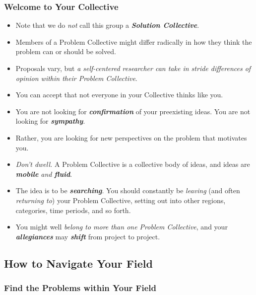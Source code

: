 \documentclass[11pt]{article}
\begin{document}
\subsubsection{Welcome to Your Collective}
\begin{itemize}
\item Note that we do \emph{not} call this group a \emph{\textbf{Solution Collective}}.

\item Members of a Problem Collective might differ radically in how they think the problem can or should be solved.

\item Proposals vary, but \emph{a self-centered researcher can take in stride differences of opinion within their Problem Collective}. 

\item You can accept that not everyone in your Collective thinks like you.

\item You are not looking for \emph{\textbf{confirmation}} of your preexisting ideas. You are not looking for \emph{\textbf{sympathy}}.

\item Rather, you are looking for new perspectives on the problem that motivates you. 

\item \emph{Don’t dwell.} A Problem Collective is a collective body of ideas, and ideas are \emph{\textbf{mobile} and \textbf{fluid}}. 

\item The idea is to be \emph{\textbf{searching}}. You should constantly be \emph{leaving} (and often \emph{returning to}) your Problem Collective, setting out into other regions, categories, time periods, and so forth. 

\item You might well \emph{belong to more than one Problem Collective}, and your \emph{\textbf{allegiances}} may \emph{\textbf{shift}} from project to project.
\end{itemize}

\subsection{How to Navigate Your Field}
\subsubsection{Find the Problems within Your Field}
\end{document}

